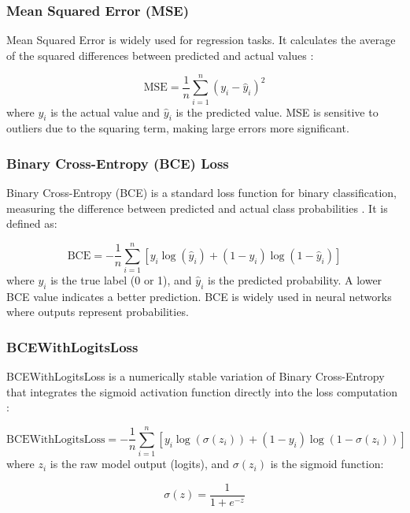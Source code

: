 \subsubsection{Mean Squared Error (MSE)}
Mean Squared Error is widely used for regression tasks. It calculates the average of the squared 
differences between predicted and actual values \cite{goodfellow2016deep}:

\begin{equation}
    \text{MSE} = \frac{1}{n} \sum_{i=1}^{n} (y_i - \hat{y}_i)^2
    \label{eq:mse}
\end{equation}
where \( y_i \) is the actual value and \( \hat{y}_i \) is the predicted value. MSE is 
sensitive to outliers due to the squaring term, making large errors more significant.

\subsubsection{Binary Cross-Entropy (BCE) Loss}
Binary Cross-Entropy (BCE) is a standard loss function for binary classification, 
measuring the difference between predicted and actual class probabilities \cite{murphy2012machine}. 
It is defined as:

\begin{equation}
    \text{BCE} = -\frac{1}{n} \sum_{i=1}^{n} [y_i \log(\hat{y}_i) + (1 - y_i) \log(1 - \hat{y}_i)]
    \label{eq:bce}
\end{equation}
where \( y_i \) is the true label (0 or 1), and \( \hat{y}_i \) is the predicted probability. 
A lower BCE value indicates a better prediction. BCE is widely used in neural networks where 
outputs represent probabilities.

\subsubsection{BCEWithLogitsLoss}
BCEWithLogitsLoss is a numerically stable variation of Binary Cross-Entropy that integrates 
the sigmoid activation function directly into the loss computation \cite{kingma2015adam}:

\begin{equation}
    \text{BCEWithLogitsLoss} = -\frac{1}{n} \sum_{i=1}^{n} [y_i \log(\sigma(z_i)) + (1 - y_i) \log(1 - \sigma(z_i))]
    \label{eq:bce-logits}
\end{equation}
where \( z_i \) is the raw model output (logits), and \( \sigma(z_i) \) is the sigmoid function:

\begin{equation}
    \sigma(z) = \frac{1}{1 + e^{-z}}
\end{equation}

